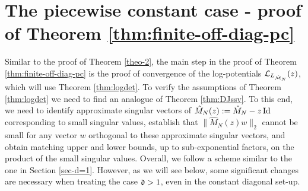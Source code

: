 \documentclass{amsart}
\numberwithin{equation}{section}
\def\corAB{}
\def\corOZ{}
\begin{document}
\section{The piecewise constant case - proof of Theorem \ref{thm:finite-off-diag-pc}}\label{sec:pf-pc-constant}
\corAB{Similar to the proof of Theorem \ref{theo-2}, the main step in the proof of Theorem \ref{thm:finite-off-diag-pc}
is the proof of convergence of the log-potentials $\mathcal{L}_{L_{\hat{\mathcal{M}}_N}}(z)$,
which will use}
\corAB{Theorem \ref{thm:logdet}. To verify the assumptions of Theorem
\ref{thm:logdet} we need to find an analogue of Theorem \ref{thm:DJssv}. To this end, we need to}
\corAB{identify approximate singular vectors  of}
\corOZ{$\hat{M}_N(z):=\hat{M}_N - z\operatorname{Id}$}
\corAB{corresponding to small singular values, establish
that $\|\hat{M}_N(z) w\|_2$ cannot be small for any vector
$w$ orthogonal to these approximate singular vectors, and obtain matching upper and lower bounds,
up to sub-exponential factors,
on the product of the small singular values. Overall, we follow a scheme similar to the one in Section \ref{sec-d=1}. However, as we will see below, some significant changes are necessary}
\corOZ{when treating}
\corAB{the case $\mathfrak{d} >1$, even in the constant diagonal set-up.}
\end{document}
